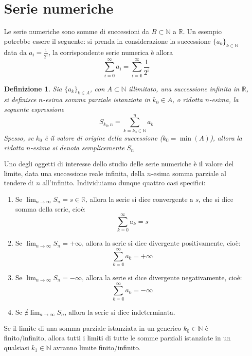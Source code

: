 \documentclass{article}
\newtheorem{definition}{Definizione}
\begin{document}
    \section{Serie numeriche}
        Le serie numeriche sono somme di successioni da $B \subset \mathbb{N}$ a $\mathbb{R}$.
        Un esempio potrebbe essere il seguente: si prenda in considerazione la successione $\{a_{k}\}_{k \in \mathbb{N}}$ data da $a_{i} = \displaystyle \frac{1}{2^{i}}$, la corrispondente serie numerica è allora
        \[
            \sum_{i = 0}^{\infty} a_{i} = \sum_{i = 0}^{\infty} \frac{1}{2^{i}}
        \]

        \begin{definition}
            Sia $\{a_{k}\}_{k \in A}$, con $A \subset \mathbb{N}$ illimitato, una successione infinita in $\mathbb{R}$, si definisce $n$-esima somma parziale istanziata in $k_{0} \in A$, o ridotta $n$-esima, la seguente espressione
            \[
                S_{k_{0}, n} = \sum_{k = k_{0} \in \mathbb{N}}^{n} a_{k}
            \]
            Spesso, se $k_{0}$ è il valore di origine della successione ($k_{0} = \min(A)$), allora la ridotta $n$-esima si denota semplicemente $S_{n}$
        \end{definition}

        Uno degli oggetti di interesse dello studio delle serie numeriche è il valore del limite, data una successione reale infinita, della $n$-esima somma parziale al tendere di $n$ all'infinito.
        Individuiamo dunque quattro casi specifici:
        \begin{enumerate}[label=(\arabic*)]
            \item Se $\displaystyle \lim_{n \rightarrow \infty} S_{n} = s \in \mathbb{R}$, allora la serie si dice convergente a $s$, che si dice somma della serie, cioè:
            \[
                \sum_{k = 0}^{\infty} a_{k} = s
            \]
            \item Se $\displaystyle \lim_{n \rightarrow \infty} S_{n} = +\infty$, allora la serie si dice divergente positivamente, cioè:
            \[
                \sum_{k = 0}^{\infty} a_{k} = +\infty
            \]
            \item Se $\displaystyle \lim_{n \rightarrow \infty} S_{n} = -\infty$, allora la serie si dice divergente negativamente, cioè:
            \[
                \sum_{k = 0}^{\infty} a_{k} = -\infty
            \]
            \item Se $\displaystyle \nexists \lim_{n \rightarrow \infty} S_{n}$, allora la serie si dice indeterminata.
        \end{enumerate}
        Se il limite di una somma parziale istanziata in un generico $k_{0} \in \mathbb{N}$ è finito/infinito, allora tutti i limiti di tutte le somme parziali istanziate in un qualsiasi $k_{1} \in \mathbb{N}$ avranno limite finito/infinito.
    
\end{document}
